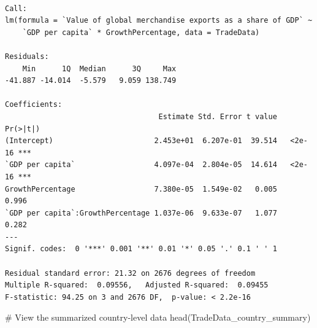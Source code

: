 \documentclass[
  10pt,
]{article}
\newenvironment{Shaded}{\begin{snugshade}}{\end{snugshade}}
\newcommand{\AttributeTok}[1]{\textcolor[rgb]{0.40,0.45,0.13}{#1}}
\newcommand{\CommentTok}[1]{\textcolor[rgb]{0.37,0.37,0.37}{#1}}
\newcommand{\FloatTok}[1]{\textcolor[rgb]{0.68,0.00,0.00}{#1}}
\newcommand{\FunctionTok}[1]{\textcolor[rgb]{0.28,0.35,0.67}{#1}}
\newcommand{\NormalTok}[1]{\textcolor[rgb]{0.00,0.23,0.31}{#1}}
\newcommand{\OtherTok}[1]{\textcolor[rgb]{0.00,0.23,0.31}{#1}}
\newcommand{\SpecialCharTok}[1]{\textcolor[rgb]{0.37,0.37,0.37}{#1}}
\newcommand{\StringTok}[1]{\textcolor[rgb]{0.13,0.47,0.30}{#1}}
\begin{document}
\begin{verbatim}

Call:
lm(formula = `Value of global merchandise exports as a share of GDP` ~ 
    `GDP per capita` * GrowthPercentage, data = TradeData)

Residuals:
    Min      1Q  Median      3Q     Max 
-41.887 -14.014  -5.579   9.059 138.749 

Coefficients:
                                   Estimate Std. Error t value Pr(>|t|)    
(Intercept)                       2.453e+01  6.207e-01  39.514   <2e-16 ***
`GDP per capita`                  4.097e-04  2.804e-05  14.614   <2e-16 ***
GrowthPercentage                  7.380e-05  1.549e-02   0.005    0.996    
`GDP per capita`:GrowthPercentage 1.037e-06  9.633e-07   1.077    0.282    
---
Signif. codes:  0 '***' 0.001 '**' 0.01 '*' 0.05 '.' 0.1 ' ' 1

Residual standard error: 21.32 on 2676 degrees of freedom
Multiple R-squared:  0.09556,   Adjusted R-squared:  0.09455 
F-statistic: 94.25 on 3 and 2676 DF,  p-value: < 2.2e-16
\end{verbatim}

\begin{Shaded}
\end{Shaded}

\begin{Shaded}
\begin{Highlighting}[]
\CommentTok{\# View the summarized country{-}level data}
\FunctionTok{head}\NormalTok{(TradeData\_country\_summary)}
\end{Highlighting}
\end{Shaded}
\end{document}

